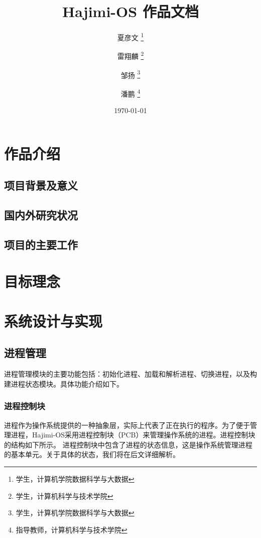 \documentclass[UTF8]{article}
\begin{document}
  \title{Hajimi-OS 作品文档}
  \author{夏彦文 \thanks{学生，计算机学院数据科学与大数据} \and 雷翔麟 \thanks{学生，计算机科学与技术学院}
  \and 邹扬 \thanks{学生，计算机学院数据科学与大数据} \and 潘鹏 \thanks{指导教师，计算机科学与技术学院}}
  \date{\today}
  \maketitle

  \newpage
  \tableofcontents
  \newpage

  \section{作品介绍}
    \subsection{项目背景及意义}
    \subsection{国内外研究状况}
    \subsection{项目的主要工作}

  \section{目标理念}

  \section{系统设计与实现}
    \subsection{进程管理}
    进程管理模块的主要功能包括：初始化进程、加载和解析进程、切换进程，以及构建进程状态模块。具体功能介绍如下。
      \subsubsection{进程控制块}
      进程作为操作系统提供的一种抽象层，实际上代表了正在执行的程序。为了便于管理进程，Hajimi-OS采用进程控制块（PCB）来管理操作系统的进程。进程控制块的结构如下所示。
      进程控制块中包含了进程的状态信息，这是操作系统管理进程的基本单元。关于具体的状态，我们将在后文详细解析。
      
\end{document}

